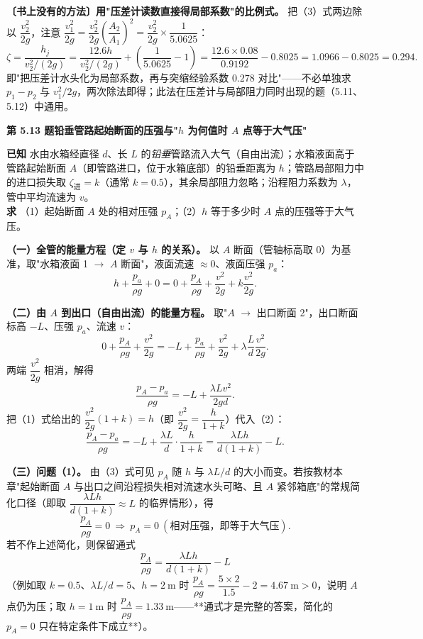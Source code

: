 \begin{banfa}
\textbf{〔书上没有的方法〕用"压差计读数直接得局部系数"的比例式。} 把（3）式两边除以 $\dfrac{v_2^2}{2g}$，注意 $\dfrac{v_1^2}{2g}=\dfrac{v_2^2}{2g}\left(\dfrac{A_2}{A_1}\right)^2=\dfrac{v_2^2}{2g}\times\dfrac{1}{5.0625}$：
\[\zeta=\frac{h_j}{v_2^2/(2g)}
=\frac{12.6h}{v_2^2/(2g)}+\left(\frac{1}{5.0625}-1\right)
=\frac{12.6\times0.08}{0.9192}-0.8025=1.0966-0.8025=0.294.\]
即"把压差计水头化为局部系数，再与突缩经验系数 $0.278$ 对比"——不必单独求 $p_1-p_2$ 与 $v_1^2/2g$，两次除法即得；此法在压差计与局部阻力同时出现的题（5.11、5.12）中通用。
\end{banfa}

\noindent\textbf{第 5.13 题\quad 铅垂管路起始断面的压强与"$h$ 为何值时 $A$ 点等于大气压"}

\begin{jie}
\textbf{已知} 水由水箱经直径 $d$、长 $L$ 的\emph{铅垂}管路流入大气（自由出流）；水箱液面高于管路起始断面 $A$（即管路进口，位于水箱底部）的铅垂距离为 $h$；管路局部阻力中的进口损失取 $\zeta_{\text{进}}=k$（通常 $k=0.5$），其余局部阻力忽略；沿程阻力系数为 $\lambda$，管中平均流速为 $v$。\\
\textbf{求} （1）起始断面 $A$ 处的相对压强 $p_A$；（2）$h$ 等于多少时 $A$ 点的压强等于大气压。

\textbf{（一）全管的能量方程（定 $v$ 与 $h$ 的关系）。} 以 $A$ 断面（管轴标高取 0）为基准，取"水箱液面 1 $\to$ $A$ 断面"，液面流速 $\approx0$、液面压强 $p_a$：
\[h+\frac{p_a}{\rho g}+0=0+\frac{p_A}{\rho g}+\frac{v^2}{2g}+k\frac{v^2}{2g}.\tag{1}\]

\textbf{（二）由 $A$ 到出口（自由出流）的能量方程。} 取"$A$ $\to$ 出口断面 2"，出口断面标高 $-L$、压强 $p_a$、流速 $v$：
\[0+\frac{p_A}{\rho g}+\frac{v^2}{2g}=-L+\frac{p_a}{\rho g}+\frac{v^2}{2g}+\lambda\frac{L}{d}\frac{v^2}{2g}.\]
两端 $\dfrac{v^2}{2g}$ 相消，解得
\[\frac{p_A-p_a}{\rho g}=-L+\frac{\lambda Lv^2}{2gd}.\tag{2}\]
把（1）式给出的 $\dfrac{v^2}{2g}(1+k)=h$（即 $\dfrac{v^2}{2g}=\dfrac{h}{1+k}$）代入（2）：
\[\frac{p_A-p_a}{\rho g}=-L+\frac{\lambda L}{d}\cdot\frac{h}{1+k}
=\frac{\lambda Lh}{d(1+k)}-L.\tag{3}\]

\textbf{（三）问题（1）。} 由（3）式可见 $p_A$ 随 $h$ 与 $\lambda L/d$ 的大小而变。若按教材本章"起始断面 $A$ 与出口之间沿程损失相对流速水头可略、且 $A$ 紧邻箱底"的常规简化口径（即取 $\dfrac{\lambda Lh}{d(1+k)}\approx L$ 的临界情形），得
\[\frac{p_A}{\rho g}=0\ \Longrightarrow\ \boxed{p_A=0\ (\text{相对压强，即等于大气压})}.\]
若不作上述简化，则保留通式
\[\boxed{\frac{p_A}{\rho g}=\frac{\lambda Lh}{d(1+k)}-L}\]
（例如取 $k=0.5$、$\lambda L/d=5$、$h=2\ \mathrm{m}$ 时 $\dfrac{p_A}{\rho g}=\dfrac{5\times2}{1.5}-2=4.67\ \mathrm{m}>0$，说明 $A$ 点仍为压；取 $h=1\ \mathrm{m}$ 时 $\dfrac{p_A}{\rho g}=1.33\ \mathrm{m}$——**通式才是完整的答案，简化的 $p_A=0$ 只在特定条件下成立**）。


\end{jie}
